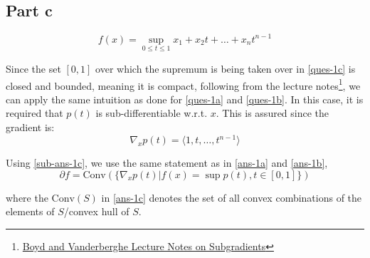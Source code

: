 \documentclass[11pt]{article}
\begin{document}
\subsection*{Part c}
\begin{flushleft}
\begin{equation}
\label{ques-1c}
\displaystyle f(x) = \sup_{0 \leq t \leq 1} x_{1} + x_{2}t + \ldots + x_{n}t^{n-1}
\end{equation}

Since the set \([0, 1]\) over which the supremum is being taken over in \ref{ques-1c} is closed and bounded, meaning it is compact, following from the lecture notes\footnote{\href{https://see.stanford.edu/materials/lsocoee364b/01-subgradients_notes.pdf}{Boyd and Vanderberghe Lecture Notes on Subgradients}}, we can apply the same intuition as done for \ref{ques-1a} and \ref{ques-1b}. In this case, it is required that \(p(t)\) is sub-differentiable w.r.t. \(x\). This is assured since the gradient is:
\begin{equation}
\label{sub-ans-1c}
\displaystyle \nabla_{x} p(t) =  \langle 1, t, \ldots, t^{n-1} \rangle
\end{equation}

Using \ref{sub-ans-1c}, we use the same statement as in \ref{ans-1a} and \ref{ans-1b},
\begin{equation}
\label{ans-1c}
\displaystyle \partial f = \text{Conv}\left(\{\nabla_{x} p(t) | f(x) = \sup p(t), t \in [0, 1]\}\right)
\end{equation}

where the \(\text{Conv}(S)\) in \ref{ans-1c} denotes the set of all convex combinations of the elements of \(S\)/convex hull of \(S\).
\end{flushleft}
\end{document}

